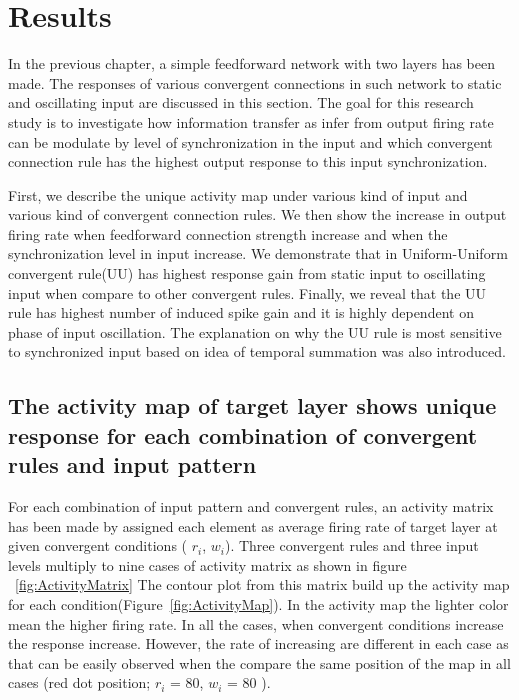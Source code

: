 \chapter{Results}
 In the previous chapter, a simple feedforward network with two layers has been made. The responses of various convergent connections in such network to static and oscillating input are discussed in this section. The goal for this research study is to investigate how information transfer as infer from output firing rate can be modulate by level of synchronization in the input and which convergent connection rule has the highest output response to this input synchronization.

 First, we describe the unique activity map under various kind of input and various kind of convergent connection rules.  We then show the increase in output firing rate when feedforward connection strength increase and when the synchronization level in input increase. 
We demonstrate that in Uniform-Uniform convergent rule(UU) has highest response gain from static input to oscillating input when compare to other convergent rules.  
Finally, we reveal that the UU rule has highest number of induced spike gain and it is highly dependent on phase of input oscillation. The explanation on why the UU rule is most sensitive to synchronized input based on idea of temporal summation was also introduced. 

%
%
%
%
%
%
%
%


\section{The activity map of target layer shows unique response for each combination of convergent rules and input pattern}
 For each combination of input pattern and convergent rules, an activity matrix has been made by assigned each element as average firing rate of target layer at given convergent conditions ( $r_i$, $w_i$). Three convergent rules and three input levels multiply to nine cases of activity matrix as shown in figure ~\ref{fig:ActivityMatrix} 
The contour plot from this matrix build up the activity map for each condition(Figure~\ref{fig:ActivityMap}). In the activity map the lighter color mean the higher firing rate.  In all the cases, when convergent conditions increase the response increase. However, the rate of increasing are different in each case as that can be easily observed when the compare the same position of the map in all cases (red dot position; $r_i$ = 80, $w_i$ = 80 ). 



